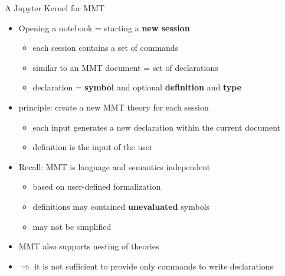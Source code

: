 \documentclass{beamer}
\begin{document}
    \begin{frame}{A Jupyter Kernel for MMT}
        \begin{itemize}
            \item Opening a notebook = starting a \textbf{new session}
            \begin{itemize}
                \item each session contains a set of commands
                \item similar to an MMT document = set of declarations
                \item declaration = \textbf{symbol} and optional \textbf{definition} and \textbf{type}
            \end{itemize}
            \item principle: create a new MMT theory for each session
            \begin{itemize}
                \item each input generates a new declaration within the current document
                \item definition is the input of the user
            \end{itemize}
            \item Recall: MMT is language and semantics independent
            \begin{itemize}
                \item based on user-defined formalization
                \item definitions may contained \textbf{unevaluated} symbols
                \item may not be simplified
            \end{itemize}
            \item MMT also supports nesting of theories
            \item $\Rightarrow$ it is not sufficient to provide only commands to write declarations
        \end{itemize}
    \end{frame}
\end{document}
